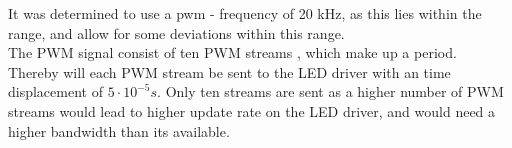It was determined to use a pwm - frequency of 20 kHz, as this lies within the range, and allow for some deviations within this range.  \\

The PWM signal consist of ten PWM streams , which make up a period. Thereby will each PWM stream be sent to the LED driver with an time displacement of $5 \cdot 10^{-5} s$.   Only ten streams are sent as a higher number of PWM streams would lead to higher update rate on the LED driver, and would need a higher bandwidth than its available.  




